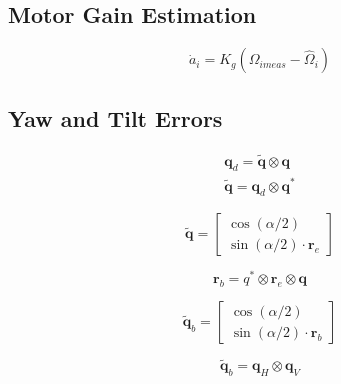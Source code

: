 \documentclass{article}
\numberwithin{equation}{section} %
\newcommand{\bs}[1]{\boldsymbol{#1}}
\begin{document}
\subsection{Motor Gain Estimation}

\begin{equation}
\dot{a}_i = K_g \left( \Omega_{imeas} - \hat{\Omega}_i \right)
\end{equation}

\subsection{Yaw and Tilt Errors}

\begin{eqnarray}
\bs{q}_d = \tilde{\bs{q}} \otimes \bs{q} \\
\tilde{\bs{q}} = \bs{q}_d \otimes \bs{q}^*
\end{eqnarray}

\begin{equation}
\tilde{\bs{q}} = 
\begin{bmatrix}
	\cos \left( \alpha / 2 \right) \\
	\sin \left( \alpha / 2 \right) \cdot \bs{r}_e
\end{bmatrix}
\end{equation}

\begin{equation}
\bs{r}_b = q^* \otimes \bs{r}_e \otimes \bs{q}
\end{equation}

\begin{equation}
\tilde{\bs{q}}_b = 
\begin{bmatrix}
	\cos \left( \alpha / 2 \right) \\
	\sin \left( \alpha / 2 \right) \cdot \bs{r}_b
\end{bmatrix}
\end{equation}

\begin{equation}
\tilde{\bs{q}}_b = \bs{q}_H \otimes \bs{q}_V
\end{equation}
\end{document}
